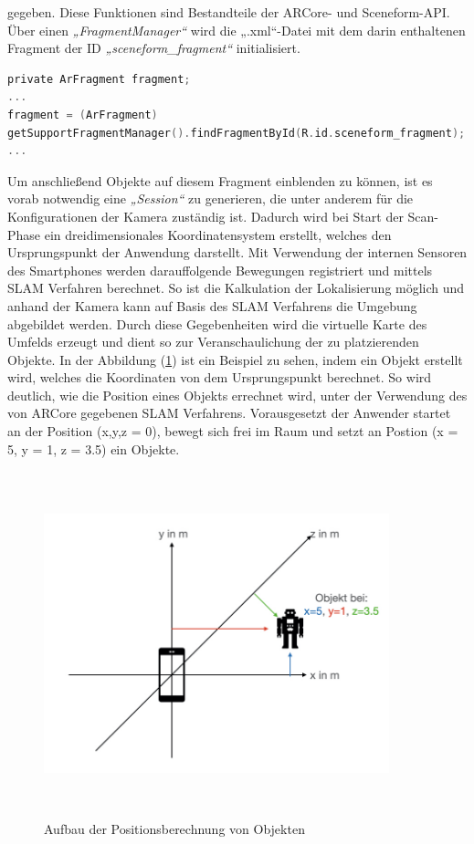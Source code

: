 gegeben. Diese Funktionen sind Bestandteile der ARCore- und Sceneform-\acs{API}. Über einen \textit{„FragmentManager“} wird die „.xml“-Datei mit dem darin 
enthaltenen Fragment der ID \textit{„sceneform\_fragment“} initialisiert.
\\
\begin{lstlisting}[language=C,
    frame=lines,           % Ein Rahmen um den Code (single for box, lines for top and bottom)
    xleftmargin=\parindent,  % Rahmen link von den Zahlen
    style=algoBericht,
    label={code:arfragment},
    captionpos=b,           % Caption unter den Code setzen
caption={Initialisierung des Fragments}]
private ArFragment fragment;
...
fragment = (ArFragment)
getSupportFragmentManager().findFragmentById(R.id.sceneform_fragment);
...
\end{lstlisting}
Um anschließend Objekte auf diesem Fragment einblenden zu können, ist es vorab notwendig eine \textit{„Session“} zu generieren, die unter anderem für die 
Konfigurationen der Kamera zuständig ist. Dadurch wird bei Start der Scan-Phase ein dreidimensionales Koordinatensystem erstellt, welches den Ursprungspunkt der 
Anwendung darstellt. Mit Verwendung der internen Sensoren des Smartphones werden darauffolgende Bewegungen registriert und mittels \acs{SLAM} Verfahren berechnet. 
So ist die Kalkulation der Lokalisierung möglich und anhand der Kamera kann auf Basis des \acs{SLAM} Verfahrens die Umgebung abgebildet werden. Durch diese 
Gegebenheiten wird die virtuelle Karte des Umfelds erzeugt und dient so zur Veranschaulichung der zu platzierenden Objekte. In der Abbildung (\ref{pic:koordin}) 
ist ein Beispiel zu sehen, indem ein Objekt erstellt wird, welches die Koordinaten von dem Ursprungspunkt berechnet. So wird deutlich, wie die Position eines 
Objekts errechnet wird, unter der Verwendung des von ARCore gegebenen \acs{SLAM} Verfahrens. Vorausgesetzt der Anwender startet an der Position (x,y,z = 0), 
bewegt sich frei im Raum und setzt an Postion (x = 5, y = 1, z = 3.5) ein Objekte.
\begin{figure}[hbt!]
    \centering
    \includegraphics[width=10cm,height=10cm,keepaspectratio]{4Umsetzung/Bilder/koordin.jpeg}
    \caption{Aufbau der Positionsberechnung von Objekten}
    \label{pic:koordin}
\end{figure}
